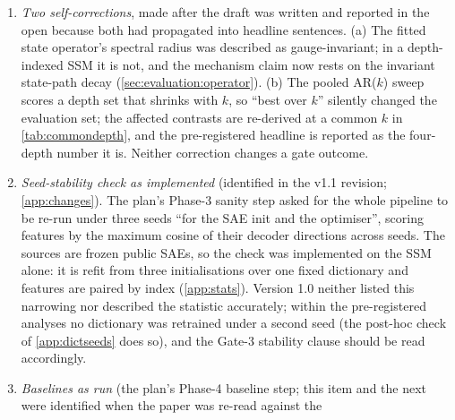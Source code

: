 \begin{enumerate}
    parameter-matched baselines; the depth-scaling series; the rank,
    parameter-budget and sample-efficiency axes of the CLT comparison and
    its validation-based reselection; the trained L1 and TopK dictionaries
    and what is derived from them (the refit-stability diagnosis, the gauge
    analysis, the L1 re-run of the causal test); the control ladder of the
    causal section (amplification, co-firing groups, count-, mass- and
    norm-matched random controls, off-target specificity); the operator and
    state-path analysis; the state probe; the source-prefix sweep beyond its
    registered embedding-only point; the paired bootstrap intervals; and the
    dictionary-level seed check of \cref{app:dictseeds}; and the four checks
    of \cref{app:checks}.
  \item \emph{Two self-corrections}, made after the draft was written and
    reported in the open because both had propagated into headline sentences.
    (a) The fitted state operator's spectral radius was described as
    gauge-invariant; in a depth-indexed SSM it is not, and the mechanism claim
    now rests on the invariant state-path decay
    (\cref{sec:evaluation:operator}). (b) The pooled AR($k$) sweep scores a
    depth set that shrinks with $k$, so ``best over $k$'' silently changed the
    evaluation set; the affected contrasts are re-derived at a common $k$ in
    \cref{tab:commondepth}, and the pre-registered headline is reported as the
    four-depth number it is. Neither correction changes a gate outcome.
  \item \emph{Seed-stability check as implemented} (identified in the v1.1
    revision; \cref{app:changes}). The plan's Phase-3 sanity step asked for
    the whole pipeline to be re-run under three seeds ``for the SAE init and
    the optimiser'', scoring features by the maximum cosine of their decoder
    directions across seeds. The sources are frozen public SAEs, so the check
    was implemented on the SSM alone: it is refit from three initialisations
    over one fixed dictionary and features are paired by index
    (\cref{app:stats}). Version 1.0 neither listed this narrowing nor
    described the statistic accurately; within the pre-registered analyses
    no dictionary was retrained under a second seed (the post-hoc check of
    \cref{app:dictseeds} does so), and the Gate-3 stability clause should be
    read accordingly.
  \item \emph{Baselines as run} (the plan's Phase-4 baseline step; this item
    and the next were identified when the paper was re-read against the

\end{enumerate}
